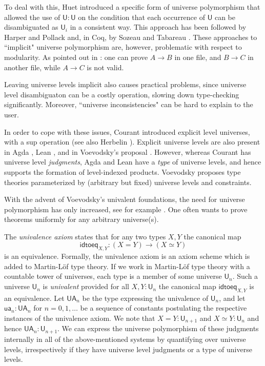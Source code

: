 \documentclass[11pt,a4paper]{article}
\theoremstyle{definition}
\newcommand{\UU}{\mathsf{U}}
\newcommand{\idtoeq}{\mathsf{idtoeq}}
\newcommand{\ua}{\mathsf{ua}}
\newcommand{\UA}{\mathsf{UA}}
\begin{document}
To deal with this, Huet \cite{Huet87} introduced a specific form of 
universe polymorphism that allowed the use of $\UU:\UU$
on the condition that each occurrence of $\UU$ can be disambiguated
as $\UU_i$ in a consistent way.
This approach has been followed by Harper and Pollack \cite{HarperP91} and,
in Coq, by Sozeau and Tabareau \cite{SozeauTabareau:coq}.
These  approaches to ``implicit" universe polymorphism are, however,
problematic with respect to modularity. As pointed out in \cite{Courant02,Simpson04}: 
one can prove $A\rightarrow B$ in one file, and $B\rightarrow C$ in 
another file, while $A\rightarrow C$ is not valid.
 
Leaving universe levels implicit also causes practical problems,
since universe level disambiguaton can be a costly operation, 
slowing down type-checking significantly. 
Moreover, ``universe inconsistencies" can be hard to explain to the user.

In order to cope with these issues, Courant \cite{Courant02}
introduced explicit level universes, 
with a sup operation (see also Herbelin \cite{herbelin05}).
Explicit universe levels are also present in Agda \cite{agda-manual}, 
Lean \cite{moura:lean},
 and in Voevodsky's proposal \cite{VV}. However, whereas Courant has
universe level \emph{judgments}, Agda and Lean have a \emph{type} of
universe levels, and hence supports the formation of level-indexed products.
Voevodsky proposes type theories parameterized by
(arbitrary but fixed) universe levels and constraints.

With the advent of Voevodsky's univalent foundations, 
the need for universe polymorphism has only increased, 
see for example \cite{VV}. 
One often wants to prove theorems uniformly for any arbitrary universe(s).

The \emph{univalence axiom} states that for any two types $X,Y$ the canonical map
$$
\idtoeq_{X,Y} : (X=Y)\to (X\simeq Y)
$$
is an equivalence.
Formally, the univalence axiom is an axiom scheme which is added to 
Martin-Löf type theory. 
If we work in Martin-Löf type theory with a countable tower of universes, 
each type is a member of some universe $\UU_n$. 
Such a universe $\UU_n$ is {\em univalent} provided for all $X,Y : \UU_n$ the 
canonical map $\idtoeq_{X,Y}$ is an equivalence. 
Let $\UA_n$ be the type expressing the univalence of $\UU_n$, and let
$\ua_n : \UA_n$ for $n = 0,1,\ldots$ be a sequence of constants postulating 
the respective instances of the univalence axiom. 
We note that $X = Y : \UU_{n+1}$ and $X\simeq Y : \UU_n$ and 
hence $\UA_n : \UU_{n+1}$. We can express the universe polymorphism of these judgments internally in all of the above-mentioned systems by quantifying over universe levels, irrespectively if they have universe level judgments or a type of universe levels.
\end{document}
